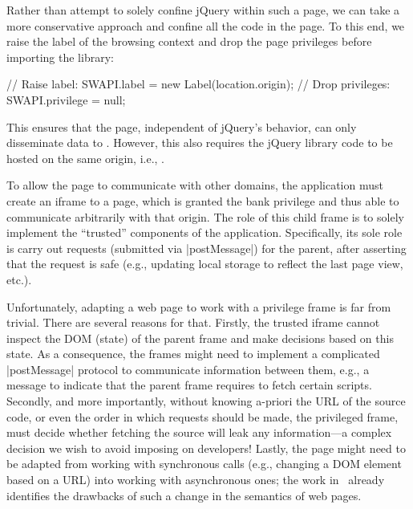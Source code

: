 Rather than attempt to solely confine jQuery within such a page, we
can take a more conservative approach and confine all the code in the
page.
%
To this end, we raise the label of the browsing context and drop the
page privileges before importing the library:
\begin{jscode}
// Raise label:
SWAPI.label = new Label(location.origin);
// Drop privileges:
SWAPI.privilege = null;
\end{jscode}
%
This ensures that the page, independent of jQuery's behavior, can only
disseminate data to .
%
However, this also requires the jQuery library code to be hosted on
the same origin, i.e., .
%

To allow the page to communicate with other domains, the application
must create an iframe to a  page, which is granted the
bank privilege and thus able to communicate arbitrarily with that origin.
%
The role of this child frame is to solely implement the ``trusted''
components of the application.
%
Specifically, its sole role is carry out requests (submitted via
\js|postMessage|) for the parent, after asserting that the request is
safe (e.g., updating local storage to reflect the last page view,
etc.).


Unfortunately, adapting a web page to work with a privilege frame 
is far from trivial. There are several reasons for that. 
%
Firstly, the trusted iframe cannot inspect the DOM (state) of the parent frame
and make decisions based on this state. As a consequence, the frames might need to
implement a complicated \js|postMessage| protocol to communicate information
between them, e.g., a message to indicate that the parent frame requires to
fetch certain scripts. Secondly, and more importantly, without knowing a-priori
the URL of the source code, or even the order in which requests should be made,
the privileged frame, must decide whether fetching the source will leak any
information---a complex decision we wish to avoid imposing on developers!
Lastly, the page might need to be adapted from working with synchronous
calls (e.g., changing a DOM element based on a URL) into working with
asynchronous ones; the work in~\cite{Ingram:2012} already
identifies the drawbacks of such a change in the semantics of web pages.


%
%
%
%



